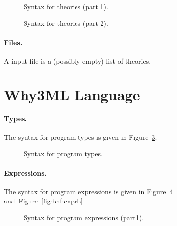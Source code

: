 \begin{figure}
  \begin{center}\framebox{}\end{center}
  \caption{Syntax for theories (part 1).}
\label{fig:bnf:theorya}
\end{figure}

\begin{figure}
  \begin{center}\framebox{}\end{center}
  \caption{Syntax for theories (part 2).}
\label{fig:bnf:theoryb}
\end{figure}

\paragraph{Files.}
A \why input file is a (possibly empty) list of theories.
\begin{center}\framebox{}\end{center}


\clearpage
\section{Why3ML Language}\label{sec:syntax:whyml}

\paragraph{Types.}
The syntax for program types is given in Figure~\ref{fig:bnf:typev}.
\begin{figure}
  \begin{center}\framebox{}\end{center}
  \caption{Syntax for program types.}
\label{fig:bnf:typev}
\end{figure}

\paragraph{Expressions.}
The syntax for program expressions is given in Figure~\ref{fig:bnf:expra} and~Figure~\ref{fig:bnf:exprb}.
\begin{figure}
  \begin{center}\framebox{}\end{center}
  \caption{Syntax for program expressions (part1).}
\label{fig:bnf:expra}
\end{figure}

